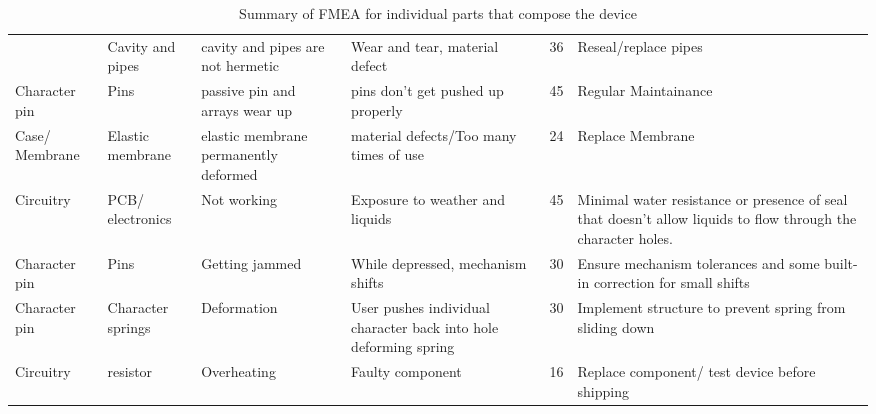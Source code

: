 \begin{table}[!ht]
\begin{tabular}{b{1.7cm} b{2cm} b{2.5cm} b{4cm}l b{6cm}}
            ~ & Cavity and pipes & cavity and pipes are not hermetic & Wear and tear, material defect & 36 & Reseal/replace pipes \\ 
            Character pin & Pins & passive pin and arrays wear up & pins don't get pushed up properly & 45 & Regular Maintainance \\ 
            Case/ Membrane & Elastic membrane & elastic membrane permanently deformed & material defects/Too many times of use & 24 & Replace Membrane  \\ 
            Circuitry & PCB/ electronics & Not working & Exposure to weather and liquids & 45 & Minimal water resistance or presence of seal that doesn't allow liquids to flow through the character holes. \\ 
            Character pin & Pins & Getting jammed & While depressed, mechanism shifts & 30 & Ensure mechanism tolerances and some built-in correction for small shifts \\ 
            Character pin & Character springs & Deformation & User pushes individual character back into hole deforming spring & 30 & Implement structure to prevent spring from sliding down \\ 
            Circuitry & resistor & Overheating & Faulty component & 16 & Replace component/ test device before shipping \\ \hline
        \end{tabular}
        \caption{Summary of FMEA for individual parts that compose the device}
    \end{table}
    \clearpage
